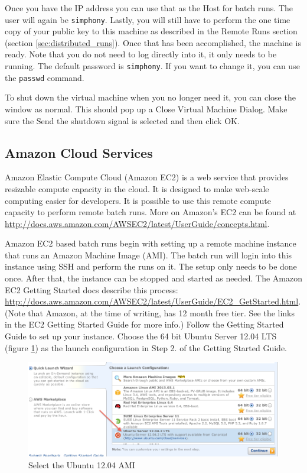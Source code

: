 \documentclass[11pt]{amsart}
\begin{document}
Once you have the IP address you can use that as the Host for batch runs. The user will again be {\tt simphony}. Lastly, you will still have to perform the one time copy of your public key to this machine as described in the Remote Runs section (section \ref{sec:distributed_runs}). Once that has been accomplished, the machine is ready. Note that you do not need to log directly into it, it only needs to be running. The default password is {\tt simphony}. If you want to change it, you can use the {\tt passwd}  command.

To shut down the virtual machine when you no longer need it, you can close the window as normal. This should pop up a Close Virtual Machine Dialog. Make sure the Send the shutdown signal is selected and then click OK.

\subsection{Amazon Cloud Services}
Amazon Elastic Compute Cloud (Amazon EC2) is a web service that provides resizable compute capacity in the cloud. It is designed to make web-scale computing easier for developers. It is possible to use this remote compute capacity to perform remote batch runs. More on Amazon's EC2 can be found at  \href{http://docs.aws.amazon.com/AWSEC2/latest/UserGuide/concepts.html}{http://docs.aws.amazon.com/AWSEC2/latest/UserGuide/concepts.html}.

Amazon EC2 based batch runs begin with setting up a remote machine instance that runs an Amazon Machine Image (AMI). The batch run will login into this instance using SSH and perform the runs on it. The setup only needs to be done once. After that, the instance can be stopped and started as needed. The Amazon EC2 Getting Started docs describe this process: \href{http://docs.aws.amazon.com/AWSEC2/latest/UserGuide/EC2_GetStarted.html}{\\http://docs.aws.amazon.com/AWSEC2/latest/UserGuide/EC2\_GetStarted.html}. (Note that Amazon, at the time of writing, has 12 month free tier. See the links in the EC2 Getting Started Guide for more info.) Follow the Getting Started Guide to set up your instance. Choose the 64 bit Ubuntu Server 12.04 LTS (figure \ref{fig:ubuntu_ami}) as the launch configuration in Step 2. of the Getting Started Guide. 

\begin{figure}[h]
\begin{center}
\vspace{.2in}
\centerline {
\includegraphics[width=6in]{images/ubuntu_ami.png}
}
\caption{Select the Ubuntu 12.04 AMI}
\label{fig:ubuntu_ami}
\end{center}
\end{figure}
\end{document}
